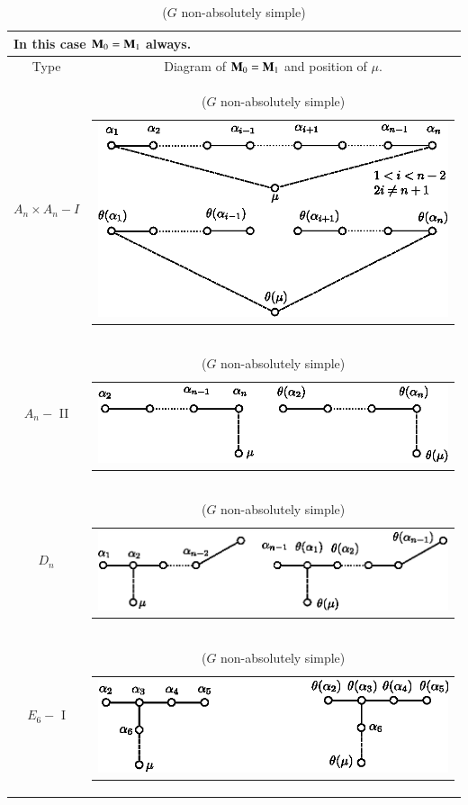 {
\tabcolsep=3pt
\begin{longtable}{@{}|c|c|@{}}
\caption{($G$ non-absolutely simple)}\\
\multicolumn{2}{l}{In this case $\mathbf{M}_0 =\mathbf{M}_1$ always.}\\\hline
Type & Diagram of $\mathbf{M}_0 = \mathbf{M}_1$ and position of $\mu$. \\\hline
$A_n \times A_n - I$ & 
\begin{tabular}{c}
{\includegraphics[scale=0.8]{307a.eps}}
\end{tabular}\\\hline
$A_n - $ II &
\begin{tabular}{c}
{\includegraphics[scale=0.8]{307b.eps}}
\end{tabular}\\\hline
$D_n$ & 
\begin{tabular}{c}
{\includegraphics[scale=0.8]{307c.eps}}
\end{tabular}\\\hline
$E_6 - $ I &
\begin{tabular}{c}
{\includegraphics[scale=0.8]{307d.eps}}

\end{tabular}
\end{longtable}}
